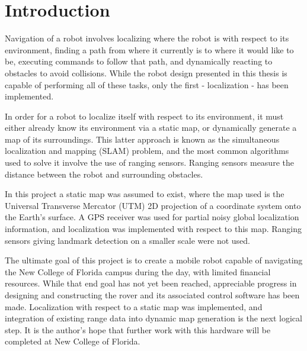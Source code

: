 \chapter*{Introduction}

Navigation of a robot involves localizing where the robot is with respect to its environment, finding a path from where it currently is to where it would like to be, executing commands to follow that path, and dynamically reacting to obstacles to avoid collisions. While the robot design presented in this thesis is capable of performing all of these tasks, only the first - localization - has been implemented.

In order for a robot to localize itself with respect to its environment, it must either already know its environment via a static map, or dynamically generate a map of its surroundings. This latter approach is known as the simultaneous localization and mapping (SLAM) problem, and the most common algorithms used to solve it involve the use of ranging sensors. Ranging sensors measure the distance between the robot and surrounding obstacles.

In this project a static map was assumed to exist, where the map used is the Universal Transverse Mercator (UTM) 2D projection of a coordinate system onto the Earth's surface. A GPS receiver was used for partial noisy global localization information, and localization was implemented with respect to this map. Ranging sensors giving landmark detection on a smaller scale were not used.





The ultimate goal of this project is to create a mobile robot capable of navigating the New College of Florida campus during the day, with limited financial resources. While that end goal has not yet been reached, appreciable progress in designing and constructing the rover and its associated control software has been made. Localization with respect to a static map was implemented, and integration of existing range data into dynamic map generation is the next logical step. It is the author's hope that further work with this hardware will be completed at New College of Florida.

